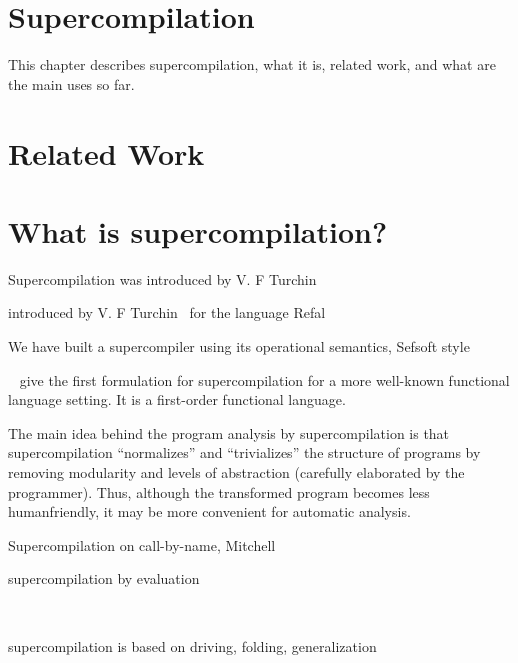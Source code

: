 
\section{Supercompilation}

\label{sec:supercompilation}


This chapter describes supercompilation, what it is, related work, and what are the main uses so far.

\section{Related Work}


\section{What is supercompilation?}

Supercompilation was introduced by V. F Turchin~\cite{Turchin:1986:CS:5956.5957}

introduced by V. F Turchin~\cite{Turchin:1986:CS:5956.5957}
for the language Refal

We have built a supercompiler using its operational semantics, Sefsoft style
~\cite{Sestoft:1997:DLA:969886.969887}

~\cite{sorm94} give the first formulation for supercompilation for a more well-known functional language setting.
It is a first-order functional language.


The main idea behind the program analysis by supercompilation is that supercompilation
“normalizes” and “trivializes” the structure of programs by
removing modularity and levels of abstraction (carefully elaborated by the
programmer).
Thus, although the transformed program becomes less humanfriendly,
it may be more convenient for automatic analysis.



Supercompilation on call-by-name, Mitchell~\cite{Mitchell:2010:RS:1863543.1863588}

supercompilation by evaluation
~\cite{Bolingbroke:2010:SE:1863523.1863540}

~\cite{UCAM-CL-TR-835}



supercompilation is based on driving, folding, generalization
